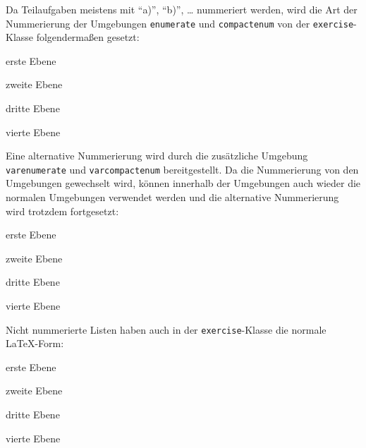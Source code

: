 \documentclass{exercise}
\begin{document}
    Da Teilaufgaben meistens mit \enquote{a)}, \enquote{b)}, \ldots{} nummeriert werden, wird die Art der Nummerierung der Umgebungen \lstinline{enumerate} und \lstinline{compactenum} von der \texttt{exercise}-Klasse folgendermaßen gesetzt:
    \begin{compactenum}
      \item erste Ebene
        \begin{compactenum}
          \item zweite Ebene
            \begin{compactenum}
              \item dritte Ebene
                \begin{compactenum}
                  \item vierte Ebene
                \end{compactenum}
            \end{compactenum}
        \end{compactenum}
    \end{compactenum}

    Eine alternative Nummerierung wird durch die zusätzliche Umgebung \lstinline{varenumerate} und \lstinline{varcompactenum} bereitgestellt. Da die Nummerierung von den Umgebungen gewechselt wird, können innerhalb der Umgebungen auch wieder die normalen Umgebungen verwendet werden und die alternative Nummerierung wird trotzdem fortgesetzt:
    \begin{varcompactenum}
      \item erste Ebene
        \begin{compactenum}
          \item zweite Ebene
            \begin{compactenum}
              \item dritte Ebene
                \begin{compactenum}
                  \item vierte Ebene
                \end{compactenum}
            \end{compactenum}
        \end{compactenum}
    \end{varcompactenum}

    Nicht nummerierte Listen haben auch in der \texttt{exercise}-Klasse die normale \LaTeX{}-Form:
    \begin{compactitem}
      \item erste Ebene
        \begin{compactitem}
          \item zweite Ebene
            \begin{compactitem}
              \item dritte Ebene
                \begin{compactitem}
                  \item vierte Ebene
                \end{compactitem}
            \end{compactitem}
        \end{compactitem}
    \end{compactitem}
\end{document}
